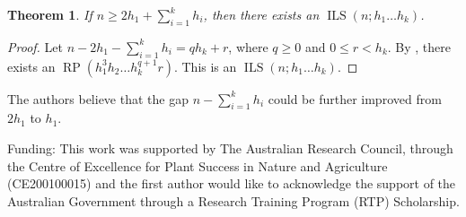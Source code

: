 \documentclass{sn-jnl}
\newtheorem{theorem}{Theorem}[section]
\theoremstyle{definition}
\DeclareMathOperator{\LS}{RP}
\DeclareMathOperator{\ILS}{ILS}
\begin{document}
\begin{theorem}
    If $n\geq 2h_1+\sum_{i=1}^kh_i$, then there exists an $\ILS(n;h_1\dots h_k)$.    
\end{theorem}
\begin{proof}
    Let $n-2h_1-\sum_{i=1}^kh_i = qh_k + r$, where $q\geq 0$ and $0\leq r< h_k$. By , there exists an $\LS(h_1^3h_2\dots h_k^{q+1}r)$. This is an $\ILS(n;h_1\dots h_k)$.
\end{proof}

The authors believe that the gap $n-\sum_{i=1}^kh_i$ could be further improved from $2h_1$ to $h_1$.





\backmatter

Funding: This work was supported by The Australian Research Council, through the Centre of Excellence for Plant Success in Nature and Agriculture (CE200100015) and the first author would like to acknowledge the support of the Australian Government through a Research Training Program (RTP) Scholarship.


\printbibliography
\end{document}
